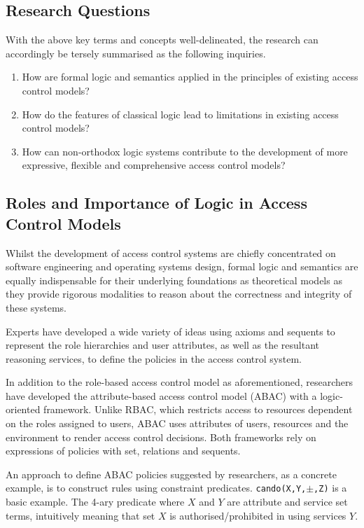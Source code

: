 \documentclass{article}
\begin{document}
\subsection*{Research Questions}

With the above key terms and concepts well-delineated, the research
can accordingly be tersely summarised as the following inquiries.
\begin{enumerate}
    \item How are formal logic and semantics applied in the principles of
    existing access control models?  \item How do the features of classical
    logic lead to limitations in existing access control models?  \item How
    can non-orthodox logic systems contribute to the development of more
    expressive, flexible and comprehensive access control models?
\end{enumerate}

\subsection*{Roles and Importance of Logic in Access Control Models}

Whilst the development of access control systems are chiefly concentrated on
software engineering and operating systems design, formal logic and semantics
are equally indispensable for their underlying foundations as theoretical
models as they provide rigorous modalities to reason about the correctness
and integrity of these systems.

Experts have developed a wide variety of ideas using axioms and sequents
to represent the role hierarchies and user attributes, as well as the
resultant reasoning services, to define the policies in the access control
system.\cite{rbac}

In addition to the role-based access control model as aforementioned,
researchers have developed the attribute-based access control model
(ABAC) with a logic-oriented framework. Unlike RBAC, which restricts
access to resources dependent on the roles assigned to users, ABAC uses
attributes of users, resources and the environment to render access control
decisions.\cite{rbac-abac} Both frameworks rely on expressions of policies
with set, relations and sequents.

An approach to define ABAC policies suggested by researchers,
as a concrete example, is to construct rules using constraint
predicates. \texttt{cando(X,Y,$\pm$,Z)} is a basic example. The 4-ary predicate
where $X$ and $Y$ are attribute and service set terms, intuitively meaning
that set $X$ is authorised/prohibited in using services $Y$.\cite{abac}
\end{document}
